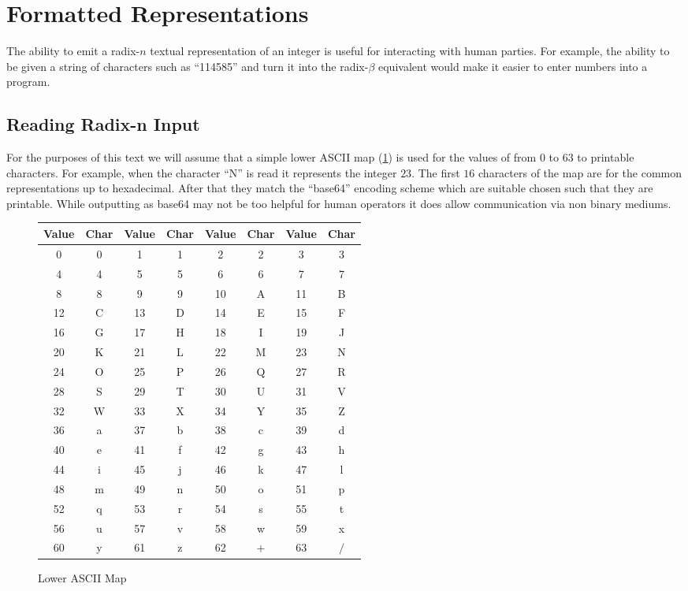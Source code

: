 \documentclass[b5paper]{book}
\begin{document}
\section{Formatted Representations}
The ability to emit a radix-$n$ textual representation of an integer is useful for interacting with human parties.  For example, the ability to
be given a string of characters such as ``114585'' and turn it into the radix-$\beta$ equivalent would make it easier to enter numbers
into a program.

\subsection{Reading Radix-n Input}
For the purposes of this text we will assume that a simple lower ASCII map (\ref{fig:ASC}) is used for the values of from $0$ to $63$ to 
printable characters.  For example, when the character ``N'' is read it represents the integer $23$.  The first $16$ characters of the
map are for the common representations up to hexadecimal.  After that they match the ``base64'' encoding scheme which are suitable chosen
such that they are printable.  While outputting as base64 may not be too helpful for human operators it does allow communication via non binary
mediums.

\newpage\begin{figure}[here]
\begin{center}
\begin{tabular}{cc|cc|cc|cc}
\hline \textbf{Value} & \textbf{Char} & \textbf{Value} & \textbf{Char} & \textbf{Value} & \textbf{Char} &  \textbf{Value} & \textbf{Char} \\
\hline 
0 & 0 & 1 & 1 & 2 & 2 & 3 & 3 \\
4 & 4 & 5 & 5 & 6 & 6 & 7 & 7 \\
8 & 8 & 9 & 9 & 10 & A & 11 & B \\
12 & C & 13 & D & 14 & E & 15 & F \\
16 & G & 17 & H & 18 & I & 19 & J \\
20 & K & 21 & L & 22 & M & 23 & N \\
24 & O & 25 & P & 26 & Q & 27 & R \\
28 & S & 29 & T & 30 & U & 31 & V \\
32 & W & 33 & X & 34 & Y & 35 & Z \\
36 & a & 37 & b & 38 & c & 39 & d \\
40 & e & 41 & f & 42 & g & 43 & h \\
44 & i & 45 & j & 46 & k & 47 & l \\
48 & m & 49 & n & 50 & o & 51 & p \\
52 & q & 53 & r & 54 & s & 55 & t \\
56 & u & 57 & v & 58 & w & 59 & x \\
60 & y & 61 & z & 62 & $+$ & 63 & $/$ \\
\hline
\end{tabular}
\end{center}
\caption{Lower ASCII Map}
\label{fig:ASC}
\end{figure}
\end{document}
